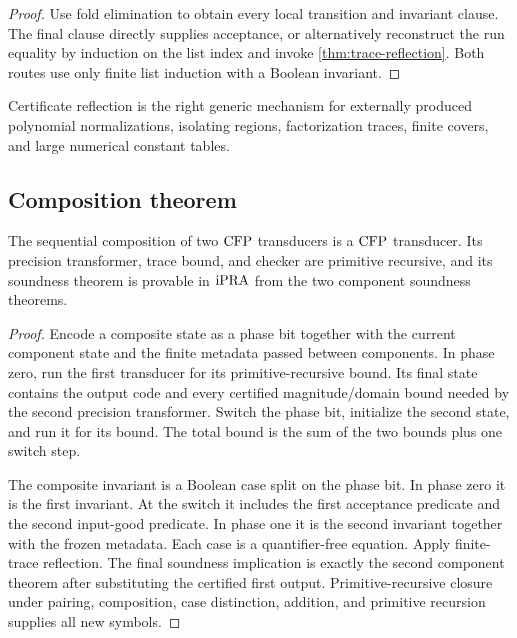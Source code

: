 \begin{proof}
Use fold elimination to obtain every local transition and invariant clause.
The final clause directly supplies acceptance, or alternatively reconstruct
the run equality by induction on the list index and invoke
\cref{thm:trace-reflection}.  Both routes use only finite list induction with a
Boolean invariant.
\end{proof}

Certificate reflection is the right generic mechanism for externally produced
polynomial normalizations, isolating regions, factorization traces, finite
covers, and large numerical constant tables.

\subsection{Composition theorem}

\begin{theorem}
\label{thm:composition}
The sequential composition of two \(\mathrm{CFP}\) transducers is a \(\mathrm{CFP}\)
transducer.  Its precision transformer, trace bound, and checker are primitive
recursive, and its soundness theorem is provable in \(\mathrm{iPRA}\) from the two
component soundness theorems.
\end{theorem}

\begin{proof}
Encode a composite state as a phase bit together with the current component
state and the finite metadata passed between components.  In phase zero, run
the first transducer for its primitive-recursive bound.  Its final state
contains the output code and every certified magnitude/domain bound needed by
the second precision transformer.  Switch the phase bit, initialize the
second state, and run it for its bound.  The total bound is the sum of the two
bounds plus one switch step.

The composite invariant is a Boolean case split on the phase bit.  In phase
zero it is the first invariant.  At the switch it includes the first
acceptance predicate and the second input-good predicate.  In phase one it is
the second invariant together with the frozen metadata.  Each case is a
quantifier-free equation.  Apply finite-trace reflection.  The final soundness
implication is exactly the second component theorem after substituting the
certified first output.  Primitive-recursive closure under pairing,
composition, case distinction, addition, and primitive recursion supplies all
new symbols.
\end{proof}

